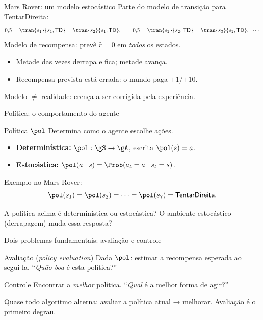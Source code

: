\documentclass[aspectratio=169, 11pt]{beamer}
\newcommand{\paradiscussao}{\smallskip
  {\footnotesize\color{rlCinza}\itshape }}
\begin{document}
\begin{frame}{Mars Rover: um modelo estocástico}
  Parte do modelo de transição para \textsf{TentarDireita}:
  \[
    0{,}5 = \tran{s_1}{s_1, \textsf{TD}} = \tran{s_2}{s_1, \textsf{TD}},
    \qquad
    0{,}5 = \tran{s_2}{s_2, \textsf{TD}} = \tran{s_3}{s_2, \textsf{TD}},
    \;\;\cdots
  \]
  Modelo de recompensa: prevê $\hat r = 0$ em \emph{todos} os estados.

  \begin{itemize}
    \item Metade das vezes derrapa e fica; metade avança.
    \item Recompensa prevista está \alert{errada}: o mundo paga $+1$/$+10$.
  \end{itemize}

  \begin{ideiabox}
    Modelo $\neq$ realidade: crença a ser corrigida pela experiência.
  \end{ideiabox}
\end{frame}

\begin{frame}{Política: o comportamento do agente}
  \begin{defbox}{Política $\pol$}
    Determina como o agente escolhe ações.
    \begin{itemize}
      \item \textbf{Determinística:} $\pol : \gS \to \gA$, escrita $\pol(s) = a$.
      \item \textbf{Estocástica:} $\pol(a \mid s) = \Prob(a_t = a \mid s_t = s)$.
    \end{itemize}
  \end{defbox}

  \medskip
  Exemplo no Mars Rover:
  \[
    \pol(s_1) = \pol(s_2) = \cdots = \pol(s_7) = \textsf{TentarDireita}.
  \]

  \begin{quizbox}{}
    A política acima é determinística ou estocástica? O ambiente estocástico (derrapagem) muda essa resposta?
  \end{quizbox}
  \paradiscussao
\end{frame}

\begin{frame}{Dois problemas fundamentais: avaliação e controle}
  \begin{defbox}{Avaliação (\emph{policy evaluation})}
    Dada $\pol$: estimar a recompensa esperada ao segui-la. ``\emph{Quão boa} é esta política?''
  \end{defbox}

  \begin{defbox}{Controle}
    Encontrar a \emph{melhor} política. ``\emph{Qual} é a melhor forma de agir?''
  \end{defbox}

  \begin{ideiabox}
    Quase todo algoritmo alterna: avaliar a política atual → melhorar. Avaliação é o primeiro degrau.
  \end{ideiabox}
\end{frame}
\end{document}
